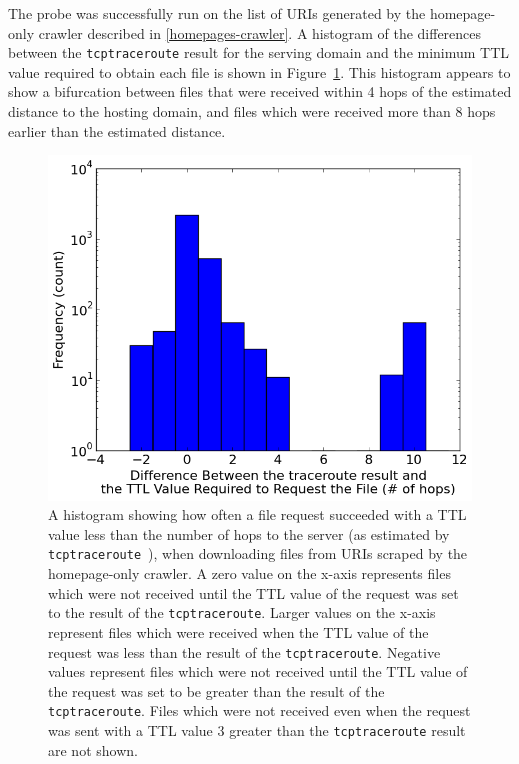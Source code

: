 The probe was successfully run on the list of URIs generated by the homepage-only crawler described in \autoref{homepages-crawler}.
A histogram of the differences between the \texttt{tcptraceroute} result for the serving domain and the minimum TTL value required to obtain each file is shown in Figure~\ref{fig_histhomepages}.
This histogram appears to show a bifurcation between files that were received within 4 hops of the estimated distance to the hosting domain, and files which were received more than 8 hops earlier than the estimated distance.
\begin{figure}
	\includegraphics[width=\columnwidth]{figures/histhomepages}
	\caption{
		A histogram showing how often a file request succeeded with a TTL value less than the number of hops to the server (as estimated by \texttt{tcptraceroute}~\cite{Toren2006}), when downloading files from URIs scraped by the homepage-only crawler.
		A zero value on the x-axis represents files which were not received until the TTL value of the request was set to the result of the \texttt{tcptraceroute}.
		Larger values on the x-axis represent files which were received when the TTL value of the request was less than the result of the \texttt{tcptraceroute}.
		Negative values represent files which were not received until the TTL value of the request was set to be greater than the result of the \texttt{tcptraceroute}.
		Files which were not received even when the request was sent with a TTL value 3 greater than the \texttt{tcptraceroute} result are not shown.
	}
	\label{fig_histhomepages}
\end{figure}

